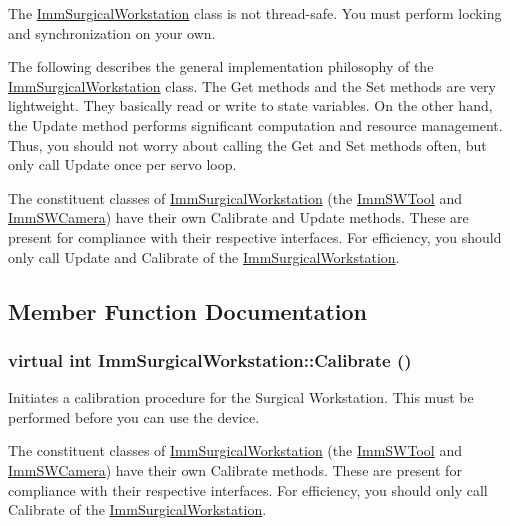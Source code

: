 The \hyperlink{classImmSurgicalWorkstation}{ImmSurgicalWorkstation} class is not thread-\/safe. You must perform locking and synchronization on your own.

The following describes the general implementation philosophy of the \hyperlink{classImmSurgicalWorkstation}{ImmSurgicalWorkstation} class. The Get methods and the Set methods are very lightweight. They basically read or write to state variables. On the other hand, the Update method performs significant computation and resource management. Thus, you should not worry about calling the Get and Set methods often, but only call Update once per servo loop.

The constituent classes of \hyperlink{classImmSurgicalWorkstation}{ImmSurgicalWorkstation} (the \hyperlink{classImmSWTool}{ImmSWTool} and \hyperlink{classImmSWCamera}{ImmSWCamera}) have their own Calibrate and Update methods. These are present for compliance with their respective interfaces. For efficiency, you should only call Update and Calibrate of the \hyperlink{classImmSurgicalWorkstation}{ImmSurgicalWorkstation}. 

\subsection{Member Function Documentation}
\hypertarget{classImmSurgicalWorkstation_a5751d512b9d6246956af0694490b0ac6}{
\subsubsection[{Calibrate}]{\setlength{\rightskip}{0pt plus 5cm}virtual int ImmSurgicalWorkstation::Calibrate ()}}
\label{classImmSurgicalWorkstation_a5751d512b9d6246956af0694490b0ac6}
Initiates a calibration procedure for the Surgical Workstation. This must be performed before you can use the device.

The constituent classes of \hyperlink{classImmSurgicalWorkstation}{ImmSurgicalWorkstation} (the \hyperlink{classImmSWTool}{ImmSWTool} and \hyperlink{classImmSWCamera}{ImmSWCamera}) have their own Calibrate methods. These are present for compliance with their respective interfaces. For efficiency, you should only call Calibrate of the \hyperlink{classImmSurgicalWorkstation}{ImmSurgicalWorkstation}.

